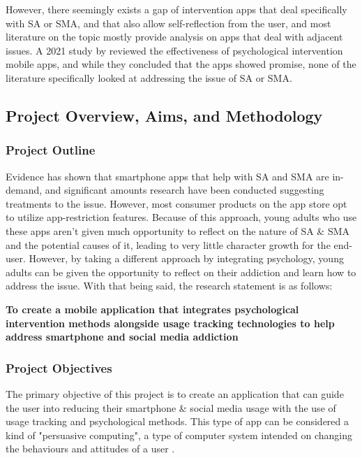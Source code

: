 \documentclass[12pt]{article}
\begin{document}
However, there seemingly exists a gap of intervention apps that deal specifically with SA or SMA, and that also 
allow self-reflection from the user, and most literature on the topic mostly provide 
analysis on apps that deal with adjacent issues. A 2021 study by \textcite{RefWorks:RefID:75-oliveira2021effectiveness} 
reviewed the effectiveness of psychological intervention mobile apps, and while they 
concluded that the apps showed promise, none of 
the literature specifically looked at addressing the issue of SA or SMA.\newline 

\subsection{Project Overview, Aims, and Methodology}

\subsubsection{Project Outline}

Evidence has shown that smartphone apps that help with SA and SMA are 
in-demand, and significant amounts research have been conducted suggesting treatments to the 
issue. However, most consumer products on the app store opt to utilize app-restriction features. Because of 
this approach, young adults who use these apps aren't given much opportunity to reflect on the nature of SA \& SMA 
and the potential causes of it, leading to very little character growth for the end-user. However, by taking a 
different approach by integrating psychology, young adults can be given the opportunity to reflect on their 
addiction and learn how to address the issue. With that being said, the research statement is as follows: \newline

\noindent\textbf{To create a mobile application that integrates psychological intervention methods alongside usage 
tracking technologies to help address smartphone and social media addiction}

\subsubsection{Project Objectives}
The primary objective of this project is to create an application that can guide the user into reducing their smartphone 
\& social media usage with the use of usage tracking and psychological methods. This type of app can be considered a kind
of "persuasive computing", a type of computer system intended on changing the behaviours and attitudes of a user 
\autocite{RefWorks:RefID:176-davis2009design}.\newline
\end{document}
